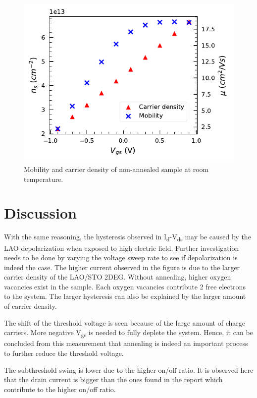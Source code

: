 \documentclass[11pt,a4paper]{report}
\begin{document}
\begin{figure}
    \centering
    \includegraphics[scale=1]{Figures/Batch1/Mobility_and_Carrier_density_sample2}
    \caption{Mobility and carrier density of non-annealed sample at room  temperature.}
    \label{fig:Appendix-mobility and carrier-appendix}
\end{figure}

\section{Discussion}
With the same reasoning, the hysteresis observed in I\textsubscript{d}-V\textsubscript{ds} may be caused by the LAO depolarization when exposed to high electric field. Further investigation needs to be done by varying the voltage sweep rate to see if depolarization is indeed the case. The higher current observed in the figure is due to the larger carrier density of the LAO/STO 2DEG. Without annealing, higher oxygen vacancies exist in the sample. Each oxygen vacancies contribute 2 free electrons to the system. The larger hysteresis can also be explained by the larger amount of carrier density.

The shift of the threshold voltage is seen because of the large amount of charge carriers. More negative V\textsubscript{gs} is needed to fully deplete the system. Hence, it can be concluded from this measurement that annealing is indeed an important process to further reduce the threshold voltage. 

The subthreshold swing is lower due to the higher on/off ratio. It is observed here that the drain current is bigger than the ones found in the report which contribute to the higher on/off ratio.
\end{document}
